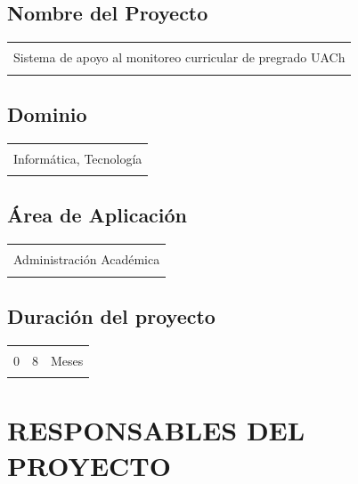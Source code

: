 \documentclass[12pt]{article}
\begin{document}
		\subsection{Nombre del Proyecto}
			\begin{tabular}{ |c|} \hline
			\\
			 {\large Sistema de apoyo al monitoreo curricular de pregrado UACh}\\
			\\
			 \hline
			
			\end{tabular}
		 
		\subsection{Dominio}
			\begin{tabular}{ |c|} \hline
			\\
			 {\large Informática, Tecnología}\\
			\\
			 \hline
			 \end{tabular}
		\subsection{Área de Aplicación}
			\begin{tabular}{ |c|} \hline
			\\
			 {\large Administración Académica}\\
			\\
			 \hline
			 \end{tabular}
		\subsection{Duración del proyecto}
		
			\begin{tabular}{ |c|c|c|} \hline
			& & \\
			 0 & 8 & {\large Meses }\\
			
			& & \\
			 \hline
			
			\end{tabular}
			\newpage
	\section{RESPONSABLES DEL PROYECTO}
\end{document}
